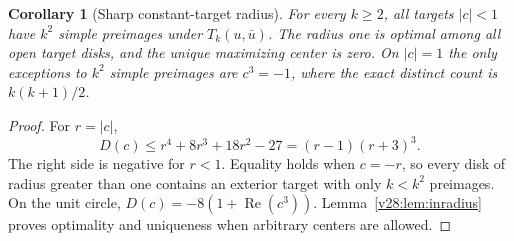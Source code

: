 \documentclass[UTF8,11pt]{ctexart}
\newtheorem{cor}[thm]{Corollary}
\theoremstyle{definition}
\numberwithin{equation}{section}
\DeclareMathOperator{\Rea}{Re}\DeclareMathOperator{\Ima}{Im}
\begin{document}
\begin{cor}[Sharp constant-target radius]\label{v5:cor:disk}
For every $k\ge2$, all targets $|c|<1$ have $k^2$ simple
preimages under $T_k(u,\bar u)$. The radius one is optimal
among all open target disks, and the unique maximizing center is zero.
On $|c|=1$ the only
exceptions to $k^2$ simple preimages are $c^3=-1$, where
the exact distinct count is $k(k+1)/2$.
\end{cor}
\begin{proof}
For $r=|c|$,
\[
 D(c)\le r^4+8r^3+18r^2-27=(r-1)(r+3)^3.
\]
The right side is negative for $r<1$. Equality holds when
$c=-r$, so every disk of radius greater than one contains
an exterior target with only $k<k^2$ preimages. On the unit
circle, $D(c)=-8(1+\Rea(c^3))$.
Lemma~\ref{v28:lem:inradius} proves optimality and uniqueness
when arbitrary centers are allowed.
\end{proof}
\end{document}
